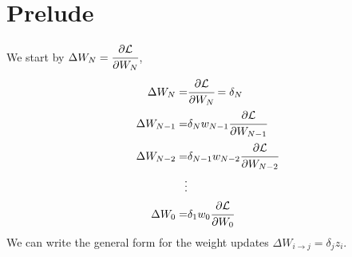 \documentclass[10pt]{article}
\begin{document}
\section*{Prelude}

We start by $\Delta W_N = \cfrac{\partial \mathcal{L}}{\partial W_N}$,
\begin{align*}
\Delta W_N =& \cfrac{\partial \mathcal{L}}{\partial W_N} = \delta_N\\
\Delta W_{N-1}=& \delta_N w_{N-1} \cfrac{\partial \mathcal{L}}{\partial W_{N-1}}\\
\Delta W_{N-2}=& \delta_{N-1} w_{N-2} \cfrac{\partial \mathcal{L}}{\partial W_{N-2}}\\
\vdots\\
\Delta W_{0}=& \delta_{1} w_{0} \cfrac{\partial \mathcal{L}}{\partial W_{0}}\\
\end{align*}
We can write the general form for the weight updates $\Delta W_{i \rightarrow j} = \delta_j z_i$.
\end{document}
